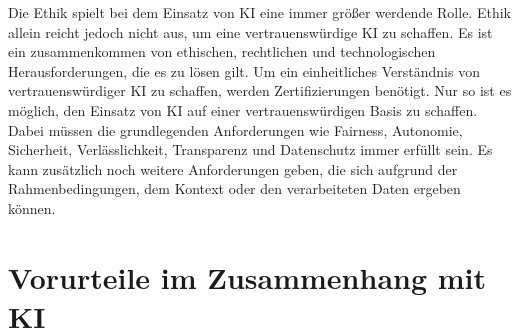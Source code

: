 \begin{onehalfspace}
        Die Ethik spielt bei dem Einsatz von \ac*{KI} eine immer größer werdende Rolle. Ethik allein reicht jedoch nicht aus, um eine vertrauenswürdige \ac*{KI} zu schaffen. Es ist ein zusammenkommen von ethischen, rechtlichen und technologischen Herausforderungen, die es zu lösen gilt. Um ein einheitliches Verständnis von vertrauenswürdiger \ac*{KI} zu schaffen, werden Zertifizierungen benötigt. Nur so ist es möglich, den Einsatz von \ac*{KI} auf einer vertrauenswürdigen Basis zu schaffen. Dabei müssen die grundlegenden Anforderungen wie Fairness, Autonomie, Sicherheit, Verlässlichkeit, Transparenz und Datenschutz immer erfüllt sein. Es kann zusätzlich noch weitere Anforderungen geben, die sich aufgrund der Rahmenbedingungen, dem Kontext oder den verarbeiteten Daten ergeben können.\cite{Cremers2019}\cite{Hagendorff2020}

    \newpage
    \section{Vorurteile im Zusammenhang mit \ac{KI}}
    \label{subsec:KIundbias}

\end{onehalfspace}
